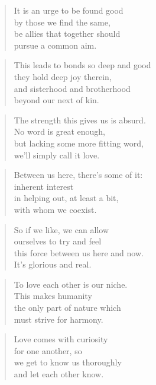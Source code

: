 \documentclass[10pt,a4paper]{article}
\begin{document}
\begin{paracol}{2}
\begin{verse}
It is an urge to be found good\\
by those we find the same,\\
be allies that together should\\
pursue a common aim.
\end{verse}

\begin{verse}
This leads to bonds so deep and good\\
they hold deep joy therein,\\
and sisterhood and brotherhood\\
beyond our next of kin.
\end{verse}

\begin{verse}
The strength this gives us is absurd.\\
No word is great enough,\\
but lacking some more fitting word,\\
we’ll simply call it love.
\end{verse}

\begin{verse}
Between us here, there’s some of it:\\
inherent interest\\
in helping out, at least a bit,\\
with whom we coexist.
\end{verse}

\begin{verse}
So if we like, we can allow\\
ourselves to try and feel\\
this force between us here and now.\\
It’s glorious and real.
\end{verse}

\begin{verse}
To love each other is our niche.\\
This makes humanity\\
the only part of nature which\\
must strive for harmony.
\end{verse}

\begin{verse}
Love comes with curiosity\\
for one another, so\\
we get to know us thoroughly\\
and let each other know.
\end{verse}


\end{paracol}
\end{document}
